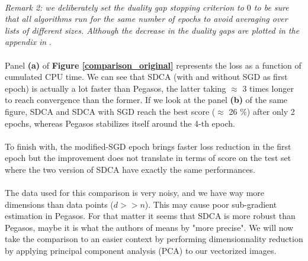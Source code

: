 \documentclass[10pt,a4paper]{article}
\begin{document}
\paragraph{}
\textit{Remark 2: we deliberately set the duality gap stopping criterion to $0$ to be sure that all algorithms run for the same number of epochs to avoid averaging over lists of different sizes. Although the decrease in the duality gaps are plotted in the appendix in }.


\paragraph{}
Panel \textbf{(a)} of \textbf{Figure \ref{comparison_original}} represents the loss as a function of cumulated CPU time. We can see that SDCA (with and without SGD as first epoch) is actually a lot faster than Pegasos, the latter taking $\approx$ 3 times longer to reach convergence than the former.  If we look at the panel \textbf{(b)} of the same figure, SDCA and SDCA with SGD reach the best score ($\approx$ 26 \%) after only 2 epochs, whereas Pegasos stabilizes itself around the 4-th epoch. 


\paragraph{}
To finish with, the modified-SGD epoch brings faster loss reduction in the first epoch but the improvement does not translate in terms of score on the test set where the two version of SDCA have exactly the same performances. 

\paragraph{}
The data used for this comparison is very noisy, and we have way more dimensions than data points ($d>>n$). This may cause poor sub-gradient estimation in Pegasos. For that matter it seems that SDCA is more robust than Pegasos, maybe it is what the authors of \cite{1} means by "more precise". We will now take the comparison to an easier context by performing dimensionnality reduction by applying principal component analysis (PCA) to our vectorized images. 

\appendix
\end{document}
